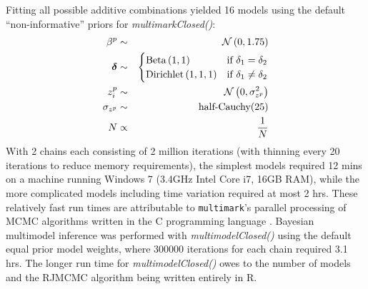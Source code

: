 \documentclass[12pt]{article}
\begin{document}
Fitting all possible additive combinations yielded 16 models using the default ``non-informative'' priors for \textit{multimarkClosed()}:
\begin{eqnarray*}
  \beta^p & \sim & {\cal N} \left( 0, 1.75 \right) \\
  \boldsymbol{\delta} & \sim & \begin{cases}
                                  \text{Beta} \left( 1, 1 \right) & \text{if } \delta_1 = \delta_2 \\
                                  \text{Dirichlet} \left( 1, 1, 1 \right) & \text{if } \delta_1 \ne \delta_2
                               \end{cases} \\
  z^p_i & \sim & {\cal N} \left( 0, \sigma^2_{z^p} \right) \\
  \sigma_{z^p} & \sim & \text{half-Cauchy}(25)\\
  N & \propto & \frac{1}{N}
\end{eqnarray*}
With 2 chains each consisting of 2 million iterations (with thinning every 20 iterations to reduce memory requirements), the simplest models required 12 mins on a machine running Windows 7 (3.4GHz Intel Core i7, 16GB RAM), while the more complicated models including time variation required at most 2 hrs. These relatively fast run times are attributable to \verb|multimark|'s parallel processing of MCMC algorithms written in the C programming language \citep{KernighanRitchie1988}. Bayesian multimodel inference was performed with \textit{multimodelClosed()} using the default equal prior model weights, where 300000 iterations for each chain required 3.1 hrs. The longer run time for \textit{multimodelClosed()} owes to the number of models and the RJMCMC algorithm being written entirely in R.
\end{document}
